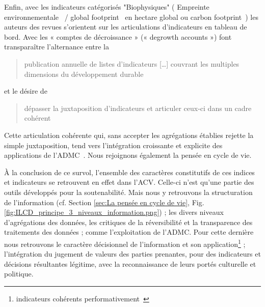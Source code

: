 Enfin, avec les indicateurs catégorisés "Biophysiques" (
Empreinte environnementale~\cite{gadrey_les_2012} / global footprint~\cite{roman_comment_2016} en hectare global ou
carbon footprint~\cite{roman_comment_2016}) les auteurs des revues s'orientent sur les articulations d'indicateurs en tableau de bord.
Avec les « comptes de décroissance » (« degrowth accounts ») \citeauthor{roman_comment_2016} font transparaître l'alternance entre la \blockcquote{roman_comment_2016}{publication annuelle de listes d’indicateurs [\ldots] couvrant les multiples dimensions du développement
durable} et le désire de \blockcquote{roman_comment_2016}{dépasser la juxtaposition d’indicateurs et articuler ceux-ci dans un cadre cohérent}.

Cette articulation cohérente qui, sans accepter les agrégations établies rejette la simple juxtaposition, tend vers l'intégration croissante et explicite des applications de l'\acrlong{ADMC}~\cite{froger_les_2005,huang_multi-criteria_2011}.
Nous rejoignons également la pensée en cycle de vie.

À la conclusion de ce survol, l'ensemble des caractères constitutifs de ces indices et indicateurs se retrouvent en effet dans l'\gls{ACV}.
Celle-ci n'est qu'une partie des outils développés pour la soutenabilité.
Mais nous y retrouvons la structuration de l'information (cf. Section \ref{sec:La pensée en cycle de vie}, Fig.\ref{fig:ILCD_principe_3_niveaux_information.png}) ; les divers niveaux d'agrégations des données, les critiques de la réversibilité et la transparence des traitements des données ; comme l'exploitation de l'\gls{ADMC}.
Pour cette dernière nous retrouvons le caractère décisionnel de l'information et son application\footnote{indicateurs cohérents performativement~\cite{thiry_au-a_2012}} ; l'intégration du jugement de valeurs des parties prenantes, pour des indicateurs et décisions résultantes légitime, avec la reconnaissance de leurs portés culturelle et politique.


